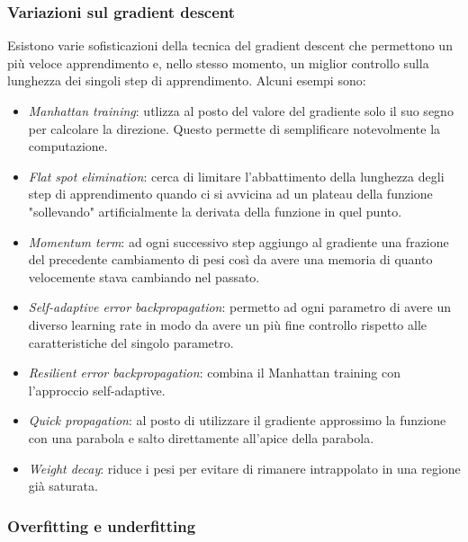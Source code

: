 \documentclass[10pt,a4paper]{article}
\begin{document}
\subsubsection{Variazioni sul gradient descent}

Esistono varie sofisticazioni della tecnica del gradient descent che permettono un più veloce apprendimento e, nello stesso momento, un miglior controllo sulla lunghezza dei singoli step di apprendimento. Alcuni esempi sono:

\begin{itemize}
\item{\emph{Manhattan training}: utlizza al posto del valore del gradiente solo il suo segno per calcolare la direzione. Questo permette di semplificare notevolmente la computazione.}
\item{\emph{Flat spot elimination}: cerca di limitare l'abbattimento della lunghezza degli step di apprendimento quando ci si avvicina ad un plateau della funzione "sollevando" artificialmente la derivata della funzione in quel punto.}
\item{\emph{Momentum term}: ad ogni successivo step aggiungo al gradiente una frazione del precedente cambiamento di pesi così da avere una memoria di quanto velocemente stava cambiando nel passato.}
\item{\emph{Self-adaptive error backpropagation}: permetto ad ogni parametro di avere un diverso learning rate in modo da avere un più fine controllo rispetto alle caratteristiche del singolo parametro.}
\item{\emph{Resilient error backpropagation}: combina il Manhattan training con l'approccio self-adaptive.}
\item{\emph{Quick propagation}: al posto di utilizzare il gradiente approssimo la funzione con una parabola e salto direttamente all'apice della parabola.}
\item{\emph{Weight decay}: riduce i pesi per evitare di rimanere intrappolato in una regione già saturata.}
\end{itemize}

\subsubsection{Overfitting e underfitting}
\end{document}
